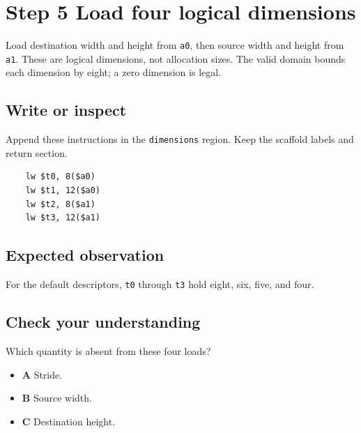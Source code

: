 \section{Step 5 Load four logical dimensions}\label{blit-s05}

Load destination width and height from \texttt{a0}, then source width and height from \texttt{a1}. These are logical dimensions, not allocation sizes. The valid domain bounds each dimension by eight; a zero dimension is legal.

\subsection{Write or inspect}
Append these instructions in the \texttt{dimensions} region. Keep the scaffold labels and return section.

\begin{verbatim}
    lw $t0, 8($a0)
    lw $t1, 12($a0)
    lw $t2, 8($a1)
    lw $t3, 12($a1)
\end{verbatim}

\subsection{Expected observation}
For the default descriptors, \texttt{t0} through \texttt{t3} hold eight, six, five, and four.

\subsection{Check your understanding}
Which quantity is absent from these four loads?

\begin{itemize}
  \item \textbf{A} Stride.
  \item \textbf{B} Source width.
  \item \textbf{C} Destination height.
\end{itemize}
